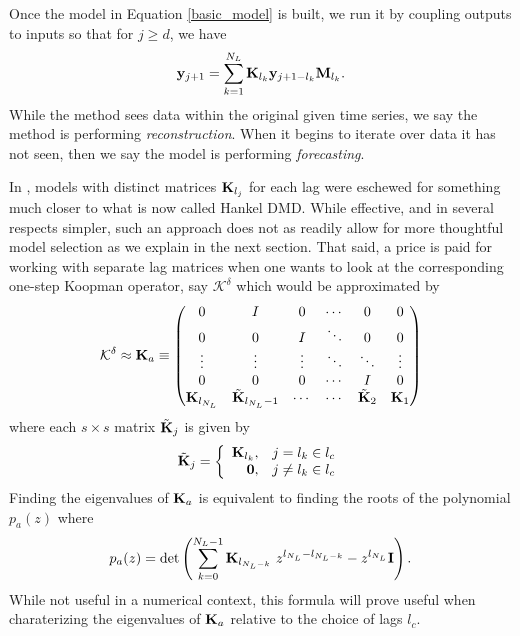 \documentclass[a4paper,11pt]{article}
\newcommand{\ba}{\begin{array}}
\newcommand{\ea}{\end{array}}
\begin{document}
Once the model in Equation \eqref{basic_model} is built, we run it by coupling outputs to inputs so that for $j\geq d$, we have 
\begin{equation}
{\bf y}_{j+1} = \sum_{k=1}^{N_{L}}{\bf K}_{l_{k}}{\bf y}_{j+1-l_{k}}{\bf M}_{l_{k}}.  
\label{iterator}
\end{equation}
While the method sees data within the original given time series, we say the method is performing {\it reconstruction}.  When it begins to iterate over data it has not seen, then we say the model is performing {\it forecasting}. 

In \cite{clainche}, models with distinct matrices ${\bf K}_{l_{j}}$ for each lag were eschewed for something much closer to what is now called Hankel DMD.  While effective, and in several respects simpler, such an approach does not as readily allow for more thoughtful model selection as we explain in the next section.  That said, a price is paid for working with separate lag matrices when one wants to look at the corresponding one-step Koopman operator, say $\mathcal{K}^{\delta}$ which would be approximated by
\begin{equation}
\mathcal{K}^{\delta} \approx {\bf K}_{a} \equiv 
\begin{pmatrix} 
0 & I & 0 & \cdots & 0 & 0 \\ 
0 & 0 & I & \ddots & 0 & 0 \\ 
\vdots & \vdots & \vdots & \ddots & \ddots & \vdots \\
0 & 0 & 0 & \cdots & I & 0 \\
{\bf K}_{l_{N_{L}}} & \tilde{{\bf K}}_{l_{N_{L}}-1} & \cdots & \cdots & \tilde{{\bf K}}_{2} & {\bf K}_{1} 
\end{pmatrix}
\label{full_matrix}
\end{equation}
where each $s\times s$ matrix $\tilde{{\bf K}}_{j}$ is given by 
\[
\tilde{{\bf K}}_{j} = \left\{
\ba{rl}  
{\bf K}_{l_{k}}, & j=l_{k}\in l_{c}\\
{\bf 0}, & j\neq l_{k}\in l_{c}
\ea
\right.
\]
Finding the eigenvalues of ${\bf K}_{a}$ is equivalent to finding the roots of the polynomial $p_{a}(z)$ where 
\begin{equation}
p_{a}(z) = \text{det}\left(\sum_{k=0}^{N_{L}-1}{\bf K}_{l_{N_{L}-k}}~z^{l_{N_{L}}-l_{N_{L}-k}} - z^{l_{N_{L}}}{\bf I} \right). 
\label{characpoly}
\end{equation}
While not useful in a numerical context, this formula will prove useful when charaterizing the eigenvalues of ${\bf K}_{a}$ relative to the choice of lags $l_{c}$.  
\end{document}
